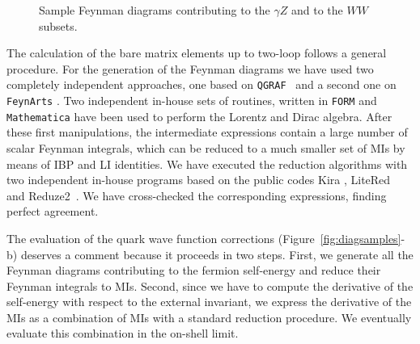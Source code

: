\documentclass[11pt,a4paper]{article}
\begin{document}
\begin{figure}[ht]
\quad
{}





\caption{Sample Feynman diagrams contributing to the $\gamma Z$ and to the $WW$ subsets.}
\label{fig:EWbosons}
\end{figure}
The calculation of the bare matrix elements up to two-loop follows
a general procedure.
For the generation of the Feynman diagrams we have used two completely independent approaches,
one based on {\tt QGRAF}~\cite{Nogueira:1991ex} and a second one on {\tt FeynArts} \cite{Hahn:2000kx}.
Two independent in-house sets of routines,
written in {\tt FORM} \cite{Vermaseren:2000nd} and {\tt Mathematica} \cite{Mathematica}
have been used to perform the Lorentz and Dirac algebra.
After these first manipulations, the intermediate expressions contain
a large number of scalar Feynman integrals,
which can be reduced to a much smaller set of MIs by means of IBP and LI identities.
We have executed the reduction algorithms with two independent in-house programs based on the public codes
{\sc Kira} \cite{Maierhofer:2017gsa}, {\sc LiteRed}~\cite{Lee:2013mka, Lee:2012cn} and
{\sc Reduze}2~\cite{vonManteuffel:2012np, Studerus:2009ye}.
We have cross-checked the corresponding expressions,
finding perfect agreement.

The evaluation of the quark wave function corrections
(Figure~\ref{fig:diagsamples}-b)
deserves a comment because it proceeds in two steps.
First, we generate all the Feynman diagrams contributing to the fermion self-energy
and reduce their Feynman integrals to MIs.
Second, since we have to compute the derivative of the self-energy with respect to the external invariant,
we express the derivative of the MIs as a combination of MIs with a standard reduction procedure.
We eventually evaluate this combination in the on-shell limit.
\end{document}
